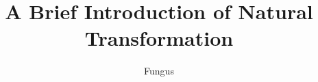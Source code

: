 \documentclass{article}
\title{A Brief Introduction of Natural Transformation}
\author{Fungus}
\begin{document}
\maketitle
\renewcommand{\thefootnote}{\color{red}{*}}
\theoremstyle{definition}
\newtheorem{defi}{Definition}
\newtheorem{thm}{Theorem}
\newtheorem{lmm}{Lemma}
\newtheorem{exm}{Example}
\newtheorem{cor}{Corollary}
\newcommand\Ob{\mathrm{Ob}}
\newcommand\Mor{\mathrm{Mor}}
\newcommand\Hom{\mathrm{Hom}}
\newcommand\id{\mathrm{id}}
\newcommand\op{^\mathrm{op}}
\newcommand\zfc{\mathsf{ZFC}}
\newcommand\con{\mathrm{Con}}
\newcommand\tid{\mathbf{id}}
\newcommand\C{\mathcal{C}}
\newcommand\D{\mathcal{D}}
\newcommand\1{\mathbf{1}}
\newcommand\iv{^{-1}}
\newcommand\equ{\mathop{\Rightarrow}\limits^{\sim}}

\end{document}

